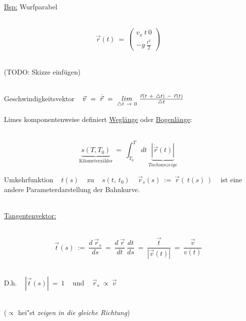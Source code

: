 \begin{flushleft}
~\\
~\\

\underline{Bsp:} \qquad Wurfparabel

~\\

\[ \vec{r}(t) ~ = ~ \left( \begin{array}{c}v_x ~ t\ 0\\ -g ~ \frac{t^2}{2}\end{array} \right) \]

~\\

(TODO: Skizze einfügen)

~\\

Geschwindigkeitsvektor ~ $\vec{v} ~ = ~ \dot{\vec{r}} ~ = ~ \underset{\triangle t ~ \rightarrow ~ 0}{lim} ~ \frac{\vec{r} (t ~ + ~ \triangle t) ~ - ~ \vec{r}(t)}{\triangle t}$

\iec

Limes komponentenweise definiert \underline{Weglänge} oder \underline{Bogenlänge}:

~\\

\[ \underbrace{ s(T, T_0) }_{\text{Kilometerzähler}} ~ = ~ \int_{T_0}^{T} ~ dt ~ \underbrace{ \left| \dot{ \vec{r} }(t) \right| }_{Tachoanzeige} \]

\iec

Umkehrfunktion ~ $t(s)$ ~ zu ~ $s(t, ~ t_0)$ ~ $\vec{r}_{s} (s) ~ := ~ \vec{r}( ~ t(s) ~ ) $ ~ ist eine andere Parameterdarstellung der Bahnkurve.

~\\

\underline{Tangentenvektor:}

~\\

\[ \vec{t} (s) ~ := ~ \frac{ d ~ \vec{r}_s }{ds} ~ = ~ \frac{d ~ \vec{r}}{dt} ~ \frac{dt}{ds} ~ = ~ \frac{\vec{t}}{\left| \vec{v} (t) \right|} ~ = ~ \frac{ \vec{v} }{ v(t) } \]

\iec

~\\

D.h. ~ $ \left| \vec{t} (s) \right| ~ = ~ 1 $ ~ und ~ $\vec{r}_s ~ \propto ~ \vec{v} $

~\\
($\propto$ hei{"s}t \textit{zeigen in die gleiche Richtung})

~\\


\end{flushleft}
